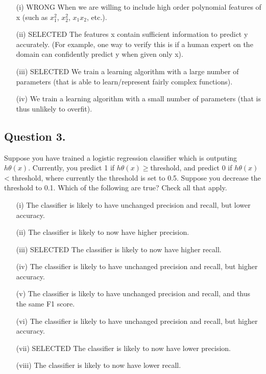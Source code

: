 \documentclass[11pt]{article} %
\begin{document}
\begin{itemize}
	\item[(i)] WRONG When we are willing to include high order polynomial features of x (such as $x^2_1$, $x^2_2$, $x_1x_2$, etc.).
	
\item[(ii)]	SELECTED The features x contain sufficient information to predict y accurately. (For example, one way to verify this is if a human expert on the domain can confidently predict y when given only x).
	
	
\item[(iii)] 	SELECTED  We train a learning algorithm with a 	large number of parameters (that is able to learn/represent fairly complex functions).
	
	
	
\item[(iv)] 	We train a learning algorithm with a small number of parameters (that is thus unlikely to overfit).
\end{itemize}



\subsection{Question 3.}

Suppose you have trained a logistic regression classifier which is outputing $h\theta(x)$. Currently, you predict 1 if $h\theta(x) \geq $threshold, and predict 0 if $h\theta(x)$ < threshold, where currently the threshold is set to 0.5. Suppose you decrease the threshold to 0.1. Which of the following are true? Check all that apply.

\begin{itemize}
	\item[(i)] The classifier is likely to have unchanged precision and recall, but lower accuracy.
	
\item[(ii)] 	The classifier is likely to now have higher precision.
	
\item[(iii)] 	SELECTED The classifier is likely to now have higher recall.
	
\item[(iv)]	The classifier is likely to have unchanged precision and recall, but higher accuracy.
	
	
\item[(v)] 	The classifier is likely to have unchanged precision and recall, and thus the same F1 score.
	
\item[(vi)] 	The classifier is likely to have unchanged precision and recall, but	higher accuracy.
	
	
\item[(vii)] 	SELECTED The classifier is likely to now have lower precision.
	
\item[(viii)]	The classifier is likely to now have lower recall.
\end{itemize}
\end{document}
